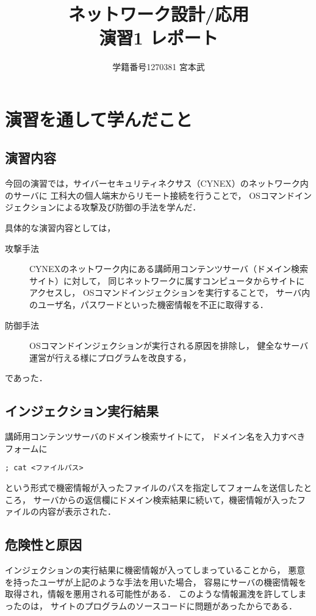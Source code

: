 \documentclass{jlreq}
\title{ネットワーク設計/応用 \\ \vspace{0.3cm} 演習1 レポート}
\author{学籍番号1270381 宮本武}
\begin{document}
\maketitle

\section{演習を通して学んだこと}
\subsection{演習内容}
今回の演習では，サイバーセキュリティネクサス（CYNEX）のネットワーク内のサーバに
工科大の個人端末からリモート接続を行うことで，
OSコマンドインジェクションによる攻撃及び防御の手法を学んだ．

具体的な演習内容としては，
\begin{description}
    \item[攻撃手法]
    CYNEXのネットワーク内にある講師用コンテンツサーバ（ドメイン検索サイト）に対して，
    同じネットワークに属すコンピュータからサイトにアクセスし，
    OSコマンドインジェクションを実行することで，
    サーバ内のユーザ名，パスワードといった機密情報を不正に取得する．

    \vspace{0.3cm}
    \item[防御手法] 
    OSコマンドインジェクションが実行される原因を排除し，
    健全なサーバ運営が行える様にプログラムを改良する，
\end{description}
であった．

\subsection{インジェクション実行結果}
講師用コンテンツサーバのドメイン検索サイトにて，
ドメイン名を入力すべきフォームに
\begin{lstlisting}[frame={tblr}]
; cat <ファイルパス>
\end{lstlisting}
という形式で機密情報が入ったファイルのパスを指定してフォームを送信したところ，
サーバからの返信欄にドメイン検索結果に続いて，機密情報が入ったファイルの内容が表示された．

\subsection{危険性と原因}
インジェクションの実行結果に機密情報が入ってしまっていることから，
悪意を持ったユーザが上記のような手法を用いた場合，
容易にサーバの機密情報を取得され，情報を悪用される可能性がある．
このような情報漏洩を許してしまったのは，
サイトのプログラムのソースコードに問題があったからである．
\end{document}
